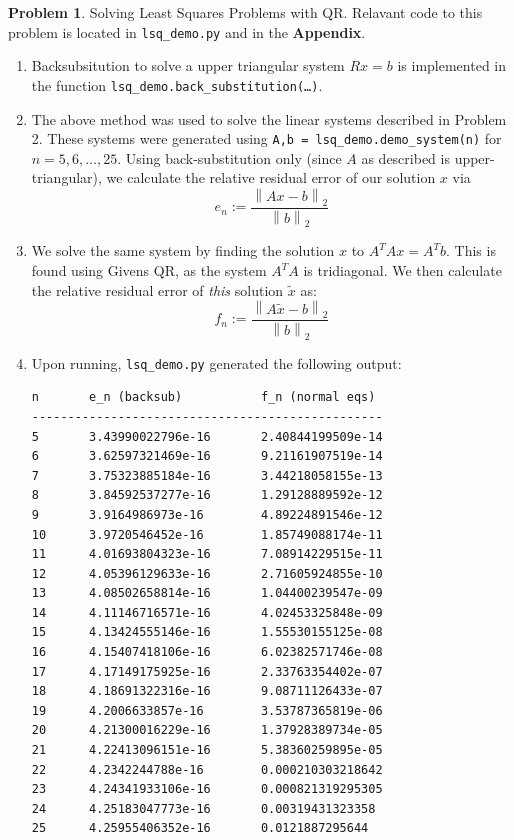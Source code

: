\documentclass[12pt]{article}
\theoremstyle{definition}
\newtheorem{prob}{Problem}
\renewcommand{\tilde}[1]{\widetilde{#1}}%
\newcommand{\norm}[1]{\left\lVert#1\right\rVert}
\begin{document}
\clearpage
\hrulefill %
\begin{prob} Solving Least Squares Problems with QR.
    Relavant code to this problem is located in
    \texttt{lsq\_demo.py} and in the \textbf{Appendix}.
    \begin{enumerate}[\bfseries(a)]

        \item Backsubsitution to solve a upper triangular system $Rx=b$ is implemented in
            the function \texttt{lsq\_demo.back\_substitution(\dots)}.

        \item The above method was used to solve the linear systems described in Problem 2. These systems
            were generated using \texttt{A,b = lsq\_demo.demo\_system(n)} for $n = 5,6,\ldots,25$.
            Using back-substitution only (since $A$ as described is upper-triangular), we
            calculate the relative residual error of our solution $x$ via
            \[
                    e_n := \frac{\norm{Ax - b}_2}{\norm{b}_2}
                \]

        \item We solve the same system by finding the solution $x$ to $A^TA x = A^Tb$. This is found using
            Givens QR, as the system $A^TA$ is tridiagonal.
            We then calculate the relative residual error of \textit{this} solution $\tilde{x}$ as:
            \[
                    f_n := \frac{\norm{A\tilde{x} - b}_2}{\norm{b}_2}
                \]

        \item
Upon running, \texttt{lsq\_demo.py} generated the following output:
\begin{small}
\begin{verbatim}
n       e_n (backsub)           f_n (normal eqs)
-------------------------------------------------
5       3.43990022796e-16       2.40844199509e-14
6       3.62597321469e-16       9.21161907519e-14
7       3.75323885184e-16       3.44218058155e-13
8       3.84592537277e-16       1.29128889592e-12
9       3.9164986973e-16        4.89224891546e-12
10      3.9720546452e-16        1.85749088174e-11
11      4.01693804323e-16       7.08914229515e-11
12      4.05396129633e-16       2.71605924855e-10
13      4.08502658814e-16       1.04400239547e-09
14      4.11146716571e-16       4.02453325848e-09
15      4.13424555146e-16       1.55530155125e-08
16      4.15407418106e-16       6.02382571746e-08
17      4.17149175925e-16       2.33763354402e-07
18      4.18691322316e-16       9.08711126433e-07
19      4.2006633857e-16        3.53787365819e-06
20      4.21300016229e-16       1.37928389734e-05
21      4.22413096151e-16       5.38360259895e-05
22      4.2342244788e-16        0.000210303218642
23      4.24341933106e-16       0.000821319295305
24      4.25183047773e-16       0.00319431323358
25      4.25955406352e-16       0.0121887295644


\end{verbatim}
\end{small}
\end{enumerate}
\end{prob}
\end{document}
